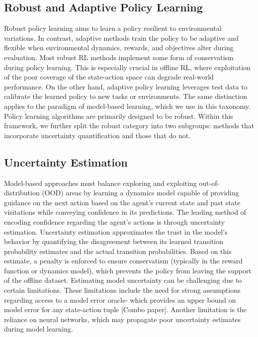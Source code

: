 \subsection{Robust and Adaptive Policy Learning}
Robust policy learning aims to learn a policy resilient to environmental variations. In contrast, adaptive methods train the policy to be adaptive and flexible when environmental dynamics, rewards, and objectives alter during evaluation. Most robust RL methods implement some form of conservatism during policy learning. This is especially crucial in offline RL, where exploitation of the poor coverage of the state-action space can degrade real-world performance. On the other hand, adaptive policy learning leverages test data to calibrate the learned policy to new tasks or environments. The same distinction applies to the paradigm of model-based learning, which we use in this taxonomy. Policy learning algorithms are primarily designed to be robust. Within this framework, we further split the robust category into two subgroups: methods that incorporate uncertainty quantification and those that do not. 

\subsection{Uncertainty Estimation}
Model-based approaches must balance exploring and exploiting out-of-
distribution (OOD) areas by learning a dynamics model capable of providing guidance on the next action based on the agent’s current state and past state visitations while conveying confidence in its predictions. The leading method of encoding confidence regarding the agent’s actions is through uncertainty estimation. Uncertainty estimation approximates the trust in the model’s behavior by quantifying the disagreement between its learned transition probability estimates and the actual transition probabilities. Based on this estimate, a penalty is enforced to ensure conservatism (typically in the reward function or dynamics model), which prevents the policy from leaving the support of the offline dataset. Estimating model uncertainty can be challenging due to certain limitations. These limitations include the need for strong assumptions regarding access to a model error oracle- which provides an upper bound on model error for any state-action tuple [Combo paper]. Another limitation is the reliance on neural networks, which may propagate poor uncertainty estimates during model learning. 

